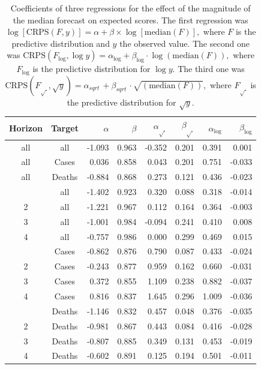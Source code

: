 \documentclass{article}
\begin{document}
\begin{table}
\centering
\begin{tabular}{ccrrrrrr}
\toprule
Horizon & Target & $\alpha$ & $\beta$ & $\alpha_\sqrt{\ }$ & $\beta_\sqrt{\ }$ & $\alpha_\log$ & $\beta_\log$ \\
\midrule
all & all & -1.093 & 0.963 & -0.352 & 0.201 & 0.391 & 0.001\\
\addlinespace
all & Cases & 0.036 & 0.858 & 0.043 & 0.201 & 0.751 & -0.033\\
all & Deaths & -0.884 & 0.868 & 0.273 & 0.121 & 0.436 & -0.023\\
\addlinespace
1 & all & -1.402 & 0.923 & 0.320 & 0.088 & 0.318 & -0.014\\
2 & all & -1.221 & 0.967 & 0.112 & 0.164 & 0.364 & -0.003\\
3 & all & -1.001 & 0.984 & -0.094 & 0.241 & 0.410 & 0.008\\
4 & all & -0.757 & 0.986 & 0.000 & 0.299 & 0.469 & 0.015\\
\addlinespace
1 & Cases & -0.862 & 0.876 & 0.790 & 0.087 & 0.433 & -0.024\\
2 & Cases & -0.243 & 0.877 & 0.959 & 0.162 & 0.660 & -0.031\\
3 & Cases & 0.372 & 0.855 & 1.109 & 0.238 & 0.882 & -0.037\\
4 & Cases & 0.816 & 0.837 & 1.645 & 0.296 & 1.009 & -0.036\\
\addlinespace
1 & Deaths & -1.146 & 0.832 & 0.457 & 0.048 & 0.376 & -0.035\\
2 & Deaths & -0.981 & 0.867 & 0.443 & 0.084 & 0.416 & -0.028\\
3 & Deaths & -0.807 & 0.885 & 0.349 & 0.131 & 0.453 & -0.019\\
4 & Deaths & -0.602 & 0.891 & 0.125 & 0.194 & 0.501 & -0.011\\
\bottomrule
\end{tabular}
\caption{Coefficients of three regressions for the effect of the magnitude of the median forecast on expected scores. The first regression was 
$\log[\text{CRPS}(F, y)] = \alpha + \beta \times \log[\text{median}(F)], $ where $F$ is the predictive distribution and $y$ the observed value. The second one was 
$\text{CRPS}(F_{\log}, \log y) = \alpha_{\log} + \beta_{\log} \cdot \log{(\text{median}(F))},$ where $F_{\log}$ is the predictive distribution for $\log y$. The third one was $\text{CRPS}(F_{\sqrt{\ }}, \sqrt{y}) = \alpha_{sqrt{\ }} + \beta_{sqrt{\ }} \cdot \sqrt{(\text{median}(F))},$ where $F_{\sqrt{\ }}$ is the predictive distribution for $\sqrt{y}$.
}
\label{tab:HUB-regression}
\end{table}
\end{document}
